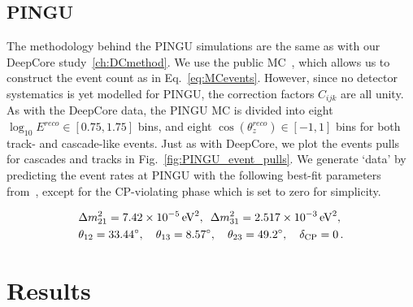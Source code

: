 \documentclass[draft=True]{revtex4-2}
\newcommand{\zreco}{\ensuremath{\cos{(\theta_z^{reco})}}}
\newcommand{\dm}{\Delta m^2_{31}}
\begin{document}
\subsection{PINGU}\label{ch:PINGUmethod}
The methodology behind the PINGU simulations are the same as with our DeepCore study~\ref{ch:DCmethod}. We use the public MC~\cite{PINGUdata}, which allows us to construct the event count as in Eq.~\ref{eq:MCevents}.
However, since no detector systematics is yet modelled for PINGU, the correction factors $C_{ijk}$ are all unity.
As with the DeepCore data, the PINGU MC is divided into eight 
$\log_{10}E^{reco} \in [0.75,1.75]$ bins, and eight $\zreco \in [-1,1]$ bins for both track- and cascade-like events. Just as with DeepCore, 
we plot the events pulls for cascades and tracks in Fig.~\ref{fig:PINGU_event_pulls}. %
We generate `data' by predicting the event rates at PINGU with the following best-fit parameters from~\cite{nufit}, except for the CP-violating phase which is set to zero for simplicity.

\begin{align}\label{eq:PINGUparams}
    &\Delta m^2_{21} =  \SI{7.42e-5}{\electronvolt^2},\hspace{0.5em} \dm =  \SI{2.517e-3}{\electronvolt^2}, \nonumber \\
    &\theta_{12} = \SI{33.44}{\degree},\hspace{1em} \theta_{13} = \SI{8.57}{\degree},\hspace{1em} \theta_{23} = \SI{49.2}{\degree}, \hspace{1em} \delta_\text{CP} = 0\,.
\end{align}


\section{Results}
\end{document}
